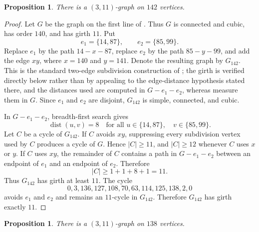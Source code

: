 \documentclass[11pt]{amsart}
\newtheorem{proposition}[theorem]{Proposition}
\newcommand{\dist}{\operatorname{dist}}
\begin{document}
\begin{proposition}\label{prop:142}
There is a $(3,11)$-graph on $142$ vertices.
\end{proposition}

\begin{proof}
Let $G$ be the graph on the first line of
. Thus $G$ is connected and cubic, has
order $140$, and has girth $11$. Put
\[
e_1=\{14,87\},\qquad e_2=\{85,99\}.
\]
Replace $e_1$ by the path $14-x-87$, replace $e_2$ by the path
$85-y-99$, and add the edge $xy$, where $x=140$ and $y=141$. Denote
the resulting graph by $G_{142}$. This is the standard two-edge
subdivision construction of \cite[Section~5.1, Technique~1]{EzeEtAl};
the girth is verified directly below rather than by appealing to the
edge-distance hypothesis stated there, and the distances used are
computed in $G-e_1-e_2$, whereas \cite{EzeEtAl} measure them in $G$.
Since
$e_1$ and $e_2$ are disjoint, $G_{142}$ is simple, connected, and cubic.

In $G-e_1-e_2$, breadth-first search gives
\[
\dist(u,v)=8
\quad\text{for all }u\in\{14,87\},\quad v\in\{85,99\}.
\]
Let $C$ be a cycle of $G_{142}$. If $C$ avoids $xy$, suppressing every
subdivision vertex used by $C$ produces a cycle of $G$. Hence
$|C|\geq 11$, and $|C|\geq 12$ whenever $C$ uses $x$ or $y$.
If $C$ uses $xy$, the remainder of $C$ contains a path in
$G-e_1-e_2$ between an endpoint of $e_1$ and an endpoint of $e_2$.
Therefore
\[
|C|\geq 1+1+8+1=11.
\]
Thus $G_{142}$ has girth at least $11$. The cycle
\[
0,3,136,127,108,70,63,114,125,138,2,0
\]
avoids $e_1$ and $e_2$ and remains an $11$-cycle in $G_{142}$.
Therefore $G_{142}$ has girth exactly $11$.
\end{proof}

\begin{proposition}\label{prop:138}
There is a $(3,11)$-graph on $138$ vertices.
\end{proposition}
\end{document}
